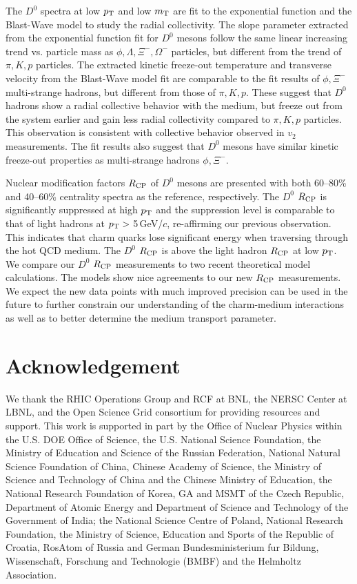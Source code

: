\documentclass[%
 reprint,	
 amsmath,amssymb,
 aps,
 prc,
]{revtex4-1}
\begin{document}
The $D^0$ spectra at low $p_{\rm T}$ and low $m_{\rm T}$ are fit to the exponential function and the Blast-Wave model to study the radial collectivity. The slope parameter extracted from the exponential function fit for $D^0$ mesons follow the same linear increasing trend vs. particle mass as $\phi,\Lambda,\Xi^-,\Omega^-$ particles, but different from the trend of $\pi,K,p$ particles. The extracted kinetic freeze-out temperature and transverse velocity from the Blast-Wave model fit are comparable to the fit results of $\phi,\Xi^-$ multi-strange hadrons, but different from those of $\pi,K,p$. These suggest that $D^0$ hadrons show a radial collective behavior with the medium, but freeze out from the system earlier and gain less radial collectivity compared to $\pi,K,p$ particles. This observation is consistent with collective behavior observed in $v_2$ measurements. The fit results also suggest that $D^0$ mesons have similar kinetic freeze-out properties as multi-strange hadrons $\phi,\Xi^-$.

Nuclear modification factors $R_{\rm CP}$ of $D^0$ mesons are presented with both 60--80\% and 40--60\% centrality spectra as the reference, respectively. The $D^0$ $R_{\rm CP}$ is significantly suppressed at high $p_{\rm T}$ and the suppression level is comparable to that of light hadrons at $p_{\rm T}>$ 5\,GeV/$c$, re-affirming our previous observation. This indicates that charm quarks lose significant energy when traversing through the hot QCD medium. The $D^0$ $R_{\rm CP}$ is above the light hadron $R_{\rm CP}$ at low $p_{\rm T}$. We compare our $D^0$ $R_{\rm CP}$ measurements to two recent theoretical model calculations. The models show nice agreements to our new $R_{\rm CP}$ measurements. We expect the new data points with much improved precision can be used in the future to further constrain our understanding of the charm-medium interactions as well as to better determine the medium transport parameter.

\section{\label{acknowledgement}Acknowledgement}

We thank the RHIC Operations Group and RCF at BNL, the NERSC Center at LBNL, and the Open Science Grid consortium for providing resources and support. This work is supported in part by the Office of Nuclear Physics within the U.S. DOE Office of Science, the U.S. National Science Foundation, the Ministry of Education and Science of the Russian Federation, National Natural Science Foundation of China, Chinese Academy of Science, the Ministry of Science and Technology of China and the Chinese Ministry of Education, the National Research Foundation of Korea, GA and MSMT of the Czech Republic, Department of Atomic Energy and Department of Science and Technology of the Government of India; the National Science Centre of Poland, National Research Foundation, the Ministry of Science, Education and Sports of the Republic of Croatia, RosAtom of Russia and German Bundesministerium fur Bildung, Wissenschaft, Forschung and Technologie (BMBF) and the Helmholtz Association.


\end{document}
